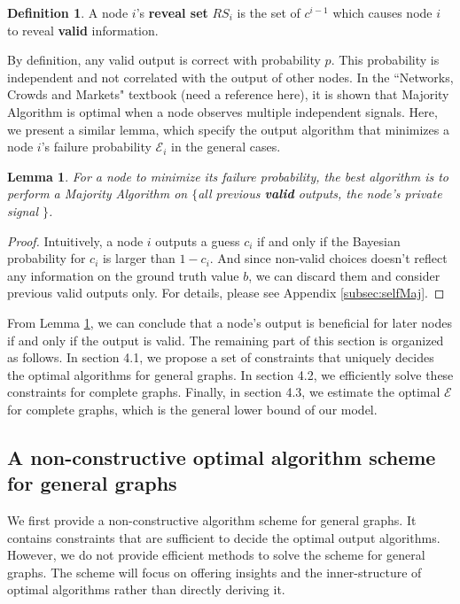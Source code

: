 \documentclass[a4paper,UKenglish]{lipics}
\newtheorem{lem}[thm]{Lemma}
\theoremstyle{definition}
\newtheorem{defn}[thm]{Definition}
\begin{document}
\begin{defn}
A node $i$'s \textbf{reveal set} $RS_i$ is the set of $c^{i-1}$ which causes node $i$ to reveal \textbf{valid} information.
\end{defn}

By definition, any valid output is correct with probability $p$.
This probability is independent and not correlated with the output of other nodes.
In the ``Networks, Crowds and Markets" textbook (need a reference here),
	it is shown that Majority Algorithm is optimal when a node observes multiple independent signals.
Here, we present a similar lemma, which specify the output algorithm that minimizes a node $i$'s failure probability $\mathcal{E}_i$ in the general cases.

\begin{lem}
\label{lem:selfMaj}
For a node to minimize its failure probability, 
	the best algorithm is to perform a Majority Algorithm on 
	$\{$all previous \textbf{valid} outputs, the node's private signal $\}$.
\end{lem}
\begin{proof}
Intuitively, a node $i$ outputs a guess $c_i$ if and only if the Bayesian probability for $c_i$ is larger than $1 - c_i$.
And since non-valid choices doesn't reflect any information on the ground truth value $b$,
	we can discard them and consider previous valid outputs only.
For details, please see Appendix \ref{subsec:selfMaj}.
\end{proof}

From Lemma \ref{lem:selfMaj}, we can conclude that a node's output is beneficial for later nodes if and only if the output is valid.
The remaining part of this section is organized as follows.
In section 4.1, we propose a set of constraints that uniquely decides the optimal algorithms for general graphs. 
In section 4.2, we efficiently solve these constraints for complete graphs. 
Finally, in section 4.3, we estimate the optimal $\mathcal{E}$ for complete graphs, which is the general lower bound of our model.


\subsection{A non-constructive optimal algorithm scheme for general graphs}
\label{Construction}
We first provide a non-constructive algorithm scheme for general graphs.
It contains constraints that are sufficient to decide the optimal output algorithms.
However, we do not provide efficient methods to solve the scheme for general graphs.
The scheme will focus on offering insights and the inner-structure of optimal algorithms rather than directly deriving it.
\end{document}
